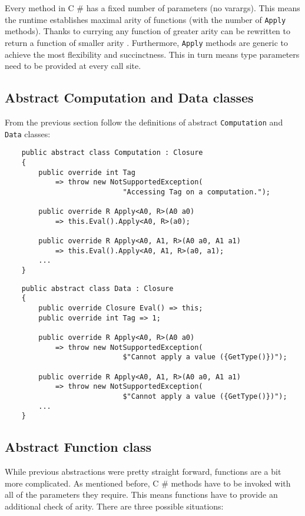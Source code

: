 \documentclass[en]{pracamgr}
\newcommand{\shrp}{%
  {\fontfamily{ppl}\selectfont\#%
  }}
\begin{document}
Every method in C\shrp{} has a fixed number of parameters (no varargs).
This means the runtime establishes maximal arity of functions
(with the number of \texttt{Apply} methods).
Thanks to currying any function of greater arity can be
rewritten to return a function of smaller arity \cite{Curry}.
Furthermore, \texttt{Apply} methods are generic to achieve
the most flexibility and succinctness.
This in turn means type parameters need to be provided at every call site.

\subsection{Abstract Computation and Data classes}

From the previous section follow the definitions of  abstract \texttt{Computation} and \texttt{Data} classes:

\begin{verbatim}
    public abstract class Computation : Closure
    {
        public override int Tag
            => throw new NotSupportedException(
                            "Accessing Tag on a computation.");

        public override R Apply<A0, R>(A0 a0)
            => this.Eval().Apply<A0, R>(a0);

        public override R Apply<A0, A1, R>(A0 a0, A1 a1)
            => this.Eval().Apply<A0, A1, R>(a0, a1);
        ...
    }
\end{verbatim}
\begin{verbatim}
    public abstract class Data : Closure
    {
        public override Closure Eval() => this;
        public override int Tag => 1;

        public override R Apply<A0, R>(A0 a0)
            => throw new NotSupportedException(
                            $"Cannot apply a value ({GetType()})");

        public override R Apply<A0, A1, R>(A0 a0, A1 a1)
            => throw new NotSupportedException(
                            $"Cannot apply a value ({GetType()})");
        ...
    }
\end{verbatim}

\newpage
\subsection{Abstract Function class}\label{s:function_class}

While previous abstractions were pretty straight forward,
functions are a bit more complicated. As mentioned before,
C\shrp{} methods have to be invoked with all of the
parameters they require.
This means functions have to provide an additional check of arity.
There are three possible situations:
\end{document}
